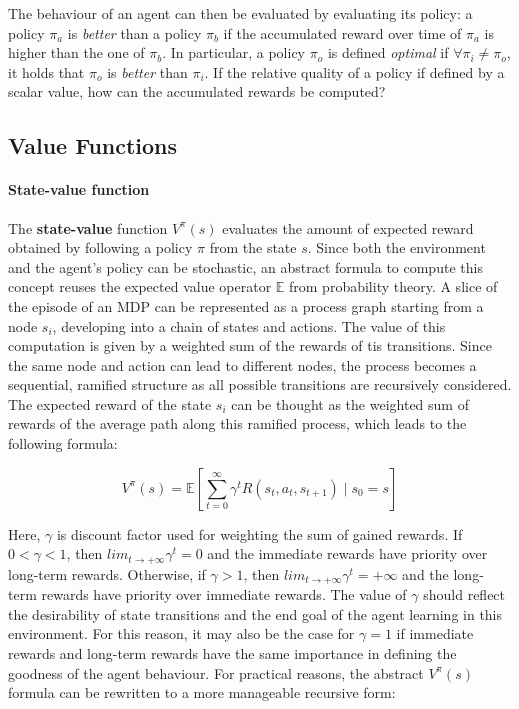 The behaviour of an agent can then be evaluated by evaluating its policy: a policy $\pi _ a$ is \textit{better} than a policy $\pi _ b$ if the accumulated reward over time of $\pi _ a$ is higher than the one of $\pi _ b$.
In particular, a policy $\pi _ o$ is defined \textit{optimal} if $\forall \pi _ i \neq \pi _ o$, it holds that $\pi _o $ is \textit{better} than $\pi _ i$.
If the relative quality of a policy if defined by a scalar value, how can the accumulated rewards be computed?

\subsection{Value Functions}

\paragraph{State-value function}
\label{par:state-value-function}

The \textbf{state-value} function $V^{\pi}(s)$ evaluates the amount of expected reward obtained by following a policy $\pi$ from the state $s$.
Since both the environment and the agent's policy can be stochastic, an abstract formula to compute this concept reuses the expected value operator $\mathbb{E}$ from probability theory.
A slice of the episode of an MDP can be represented as a process graph starting from a node $s_i$, developing into a chain of states and actions. The value of this computation is given by a weighted sum of the rewards of tis transitions.
Since the same node and action can lead to different nodes, the process becomes a sequential, ramified structure as all possible transitions are recursively considered.
The expected reward of the state $s_i$ can be thought as the weighted sum of rewards of the average path along this ramified process, which leads to the following formula:

\begin{equation} \label{eq:v-pi-E}
V^\pi(s) = \mathbb{E} \left[ \sum_{t=0}^{\infty} \gamma^t R(s_t, a_t, s_{t + 1}) \mid s_0 = s \right]
\end{equation}

Here, \textbf{$\gamma$} is discount factor used for weighting the sum of gained rewards. If $0 < \gamma < 1$, then $lim _ {t \rightarrow +\infty} \gamma ^ t = 0$ and the immediate rewards have priority over long-term rewards. Otherwise, if $\gamma > 1$, then $lim _ {t \rightarrow +\infty} \gamma ^ t = +\infty$ and the long-term rewards have priority over immediate rewards. The value of $\gamma$ should reflect the desirability of state transitions and the end goal of the agent learning in this environment. For this reason, it may also be the case for $\gamma = 1$ if immediate rewards and long-term rewards have the same importance in defining the goodness of the agent behaviour. For practical reasons, the abstract $V^{\pi}(s)$ formula can be rewritten to a more manageable recursive form:

